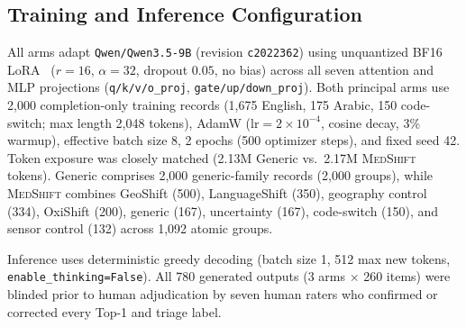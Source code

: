 \documentclass[10pt,twocolumn]{article}
\newcommand{\MedShift}{\textsc{MedShift}}
\begin{document}
\begin{table}[t]
\centering
\caption{\textsc{MedShiftBench} composition (145 linked clinical cores, 260 prompts).}
\label{tab:bench}
\footnotesize
\setlength{\tabcolsep}{3.5pt}
\end{table}

\subsection{Training and Inference Configuration}
All arms adapt \texttt{Qwen/Qwen3.5-9B} (revision \texttt{c2022362}) using unquantized BF16 LoRA~\cite{hu2022lora} ($r=16$, $\alpha=32$, dropout $0.05$, no bias) across all seven attention and MLP projections (\texttt{q/k/v/o\_proj}, \texttt{gate/up/down\_proj}). Both principal arms use 2,000 completion-only training records (1,675 English, 175 Arabic, 150 code-switch; max length 2,048 tokens), AdamW ($\text{lr}=2\times10^{-4}$, cosine decay, 3\% warmup), effective batch size 8, 2 epochs (500 optimizer steps), and fixed seed 42. Token exposure was closely matched (2.13M Generic vs.\ 2.17M \MedShift{} tokens). Generic comprises 2,000 generic-family records (2,000 groups), while \MedShift{} combines GeoShift (500), LanguageShift (350), geography control (334), OxiShift (200), generic (167), uncertainty (167), code-switch (150), and sensor control (132) across 1,092 atomic groups.

Inference uses deterministic greedy decoding (batch size 1, 512 max new tokens, \texttt{enable\_thinking=False}). All 780 generated outputs (3 arms $\times$ 260 items) were blinded prior to human adjudication by seven human raters who confirmed or corrected every Top-1 and triage label.
\end{document}
